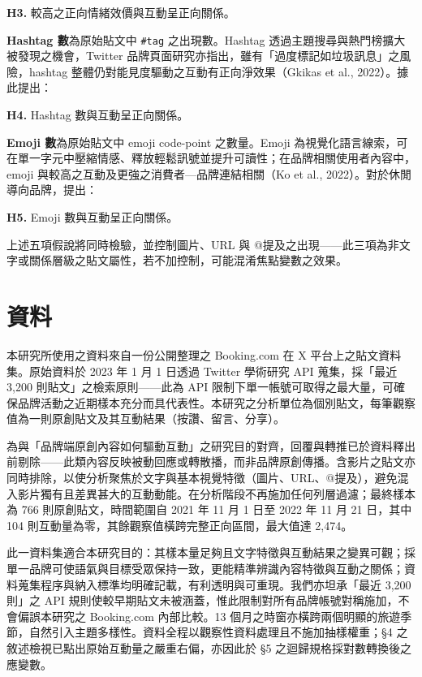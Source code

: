 \documentclass[12pt,a4paper]{ctexart}
\begin{document}
\textbf{H3.} 較高之正向情緒效價與互動呈正向關係。

\textbf{Hashtag 數}為原始貼文中 \texttt{\#tag} 之出現數。Hashtag 透過主題搜尋與熱門榜擴大被發現之機會，Twitter 品牌頁面研究亦指出，雖有「過度標記如垃圾訊息」之風險，hashtag 整體仍對能見度驅動之互動有正向淨效果（Gkikas et al., 2022）。據此提出：

\textbf{H4.} Hashtag 數與互動呈正向關係。

\textbf{Emoji 數}為原始貼文中 emoji code-point 之數量。Emoji 為視覺化語言線索，可在單一字元中壓縮情感、釋放輕鬆訊號並提升可讀性；在品牌相關使用者內容中，emoji 與較高之互動及更強之消費者—品牌連結相關（Ko et al., 2022）。對於休閒導向品牌，提出：

\textbf{H5.} Emoji 數與互動呈正向關係。

上述五項假說將同時檢驗，並控制圖片、URL 與 @提及之出現——此三項為非文字或關係層級之貼文屬性，若不加控制，可能混淆焦點變數之效果。

\section{資料}

本研究所使用之資料來自一份公開整理之 Booking.com 在 X 平台上之貼文資料集。原始資料於 2023 年 1 月 1 日透過 Twitter 學術研究 API 蒐集，採「最近 3{,}200 則貼文」之檢索原則——此為 API 限制下單一帳號可取得之最大量，可確保品牌活動之近期樣本充分而具代表性。本研究之分析單位為個別貼文，每筆觀察值為一則原創貼文及其互動結果（按讚、留言、分享）。

為與「品牌端原創內容如何驅動互動」之研究目的對齊，回覆與轉推已於資料釋出前剔除——此類內容反映被動回應或轉散播，而非品牌原創傳播。含影片之貼文亦同時排除，以使分析聚焦於文字與基本視覺特徵（圖片、URL、@提及），避免混入影片獨有且差異甚大的互動動能。在分析階段不再施加任何列層過濾；最終樣本為 766 則原創貼文，時間範圍自 2021 年 11 月 1 日至 2022 年 11 月 21 日，其中 104 則互動量為零，其餘觀察值橫跨完整正向區間，最大值達 2{,}474。

此一資料集適合本研究目的：其樣本量足夠且文字特徵與互動結果之變異可觀；採單一品牌可使語氣與目標受眾保持一致，更能精準辨識內容特徵與互動之關係；資料蒐集程序與納入標準均明確記載，有利透明與可重現。我們亦坦承「最近 3{,}200 則」之 API 規則使較早期貼文未被涵蓋，惟此限制對所有品牌帳號對稱施加，不會偏誤本研究之 Booking.com 內部比較。13 個月之時窗亦橫跨兩個明顯的旅遊季節，自然引入主題多樣性。資料全程以觀察性資料處理且不施加抽樣權重；§4 之敘述檢視已點出原始互動量之嚴重右偏，亦因此於 §5 之迴歸規格採對數轉換後之應變數。
\end{document}
